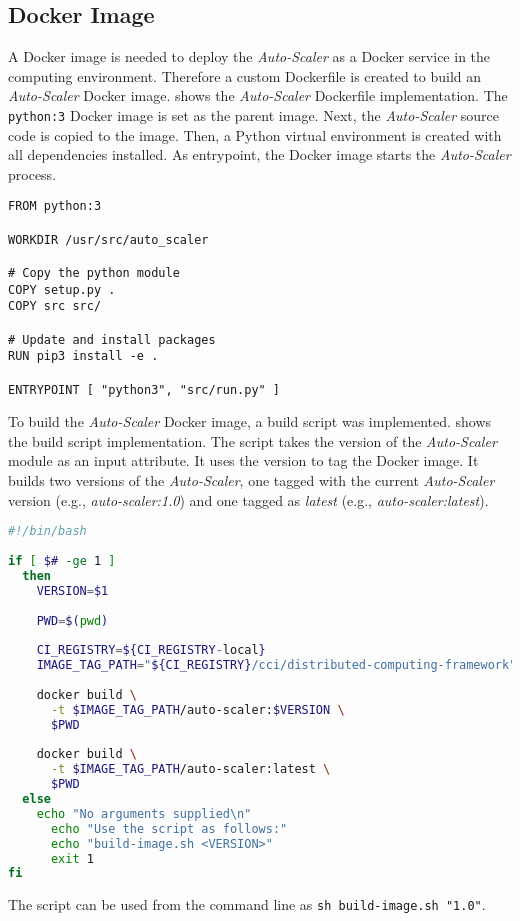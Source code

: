 \subsection{Docker Image}
A Docker image is needed to deploy the \textit{Auto-Scaler} as a Docker service in the computing environment. Therefore a custom Dockerfile is created to build an \textit{Auto-Scaler} Docker image.
 shows the \textit{Auto-Scaler} Dockerfile implementation. The \texttt{python:3} Docker image is set as the parent image. 
Next, the \textit{Auto-Scaler} source code is copied to the image. Then, a Python virtual environment is created with all dependencies installed.
As entrypoint, the Docker image starts the \textit{Auto-Scaler} process.
\begin{lstlisting}[label=lst:06_auto-scaler_dockerfile, caption=Auto-Scaler Dockerfile]
FROM python:3
 
WORKDIR /usr/src/auto_scaler
 
# Copy the python module
COPY setup.py .
COPY src src/
 
# Update and install packages
RUN pip3 install -e .
 
ENTRYPOINT [ "python3", "src/run.py" ]
\end{lstlisting}


To build the \textit{Auto-Scaler} Docker image, a build script was implemented.  shows the build script implementation.
The script takes the version of the \textit{Auto-Scaler} module as an input attribute. It uses the version to tag the Docker image.
It builds two versions of the \textit{Auto-Scaler}, one tagged with the current \textit{Auto-Scaler} version (e.g., \textit{auto-scaler:1.0}) and one tagged as \textit{latest} (e.g., \textit{auto-scaler:latest}).
\begin{lstlisting}[label=lst:06_auto-scaler_build, caption=Auto-Scaler build script, language=sh]
#!/bin/bash
 
if [ $# -ge 1 ]
  then
    VERSION=$1
 
    PWD=$(pwd)
 
    CI_REGISTRY=${CI_REGISTRY-local}
    IMAGE_TAG_PATH="${CI_REGISTRY}/cci/distributed-computing-framework"
 
    docker build \
      -t $IMAGE_TAG_PATH/auto-scaler:$VERSION \
      $PWD
 
    docker build \
      -t $IMAGE_TAG_PATH/auto-scaler:latest \
      $PWD
  else
    echo "No arguments supplied\n"
      echo "Use the script as follows:"
      echo "build-image.sh <VERSION>"
      exit 1
fi
\end{lstlisting}
The script can be used from the command line as \texttt{sh build-image.sh "1.0"}.


